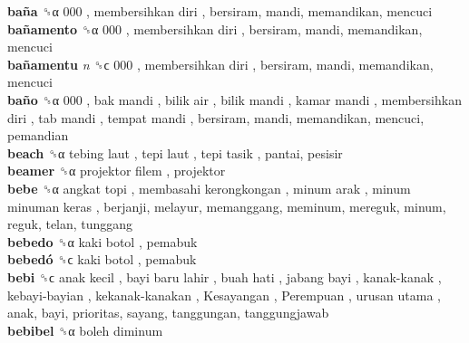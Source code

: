 \textbf{baña} ␝α   000 ,  membersihkan diri , bersiram, mandi, memandikan, mencuci  \\
\textbf{bañamento} ␝α   000 ,  membersihkan diri , bersiram, mandi, memandikan, mencuci  \\
\textbf{bañamentu} \emph{n}  ␝ϲ   000 ,  membersihkan diri , bersiram, mandi, memandikan, mencuci  \\
\textbf{baño} ␝α   000 ,  bak mandi ,  bilik air ,  bilik mandi ,  kamar mandi ,  membersihkan diri ,  tab mandi ,  tempat mandi , bersiram, mandi, memandikan, mencuci, pemandian  \\
\textbf{beach} ␝α   tebing laut ,  tepi laut ,  tepi tasik , pantai, pesisir  \\
\textbf{beamer} ␝α   projektor filem , projektor  \\
\textbf{bebe} ␝α   angkat topi ,  membasahi kerongkongan ,  minum arak ,  minum minuman keras , berjanji, melayur, memanggang, meminum, mereguk, minum, reguk, telan, tunggang  \\
\textbf{bebedo} ␝α   kaki botol , pemabuk  \\
\textbf{bebedó} ␝ϲ   kaki botol , pemabuk  \\
\textbf{bebi} ␝ϲ   anak kecil ,  bayi baru lahir ,  buah hati ,  jabang bayi ,  kanak-kanak ,  kebayi-bayian ,  kekanak-kanakan ,  Kesayangan ,  Perempuan ,  urusan utama , anak, bayi, prioritas, sayang, tanggungan, tanggungjawab  \\
\textbf{bebibel} ␝α   boleh diminum   \\
